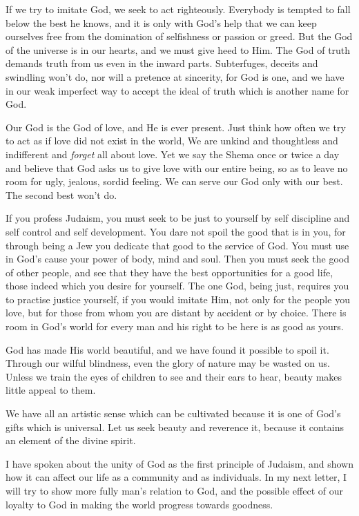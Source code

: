 If we try to imitate God, we seek to act righteously.
Everybody is tempted to fall below the best he knows, and
it is only with God's help that we can keep ourselves free
from the domination of selfishness or passion or greed.
But the God of the universe is in our hearts, and we must
give heed to Him. The God of truth demands truth from us
even in the inward parts. Subterfuges, deceits and
swindling won't do, nor will a pretence at sincerity, for
God is one, and we have in our weak imperfect way to accept
the ideal of truth which is another name for God.

Our God is the God of love, and He is ever present.
Just think how often we try to act as if love did not exist
in the world, We are unkind and thoughtless and indifferent
and \textsl{forget} all about love. Yet we say the Shema
once or twice a day and believe that God asks us to give
love with our entire being, so as to leave no room for
ugly, jealous, sordid feeling. We can serve our God only
with our best. The second best won't do.

If you profess Judaism, you must seek to be just to
yourself by self discipline and self control and self
development. You dare not spoil the good that is in you,
for through being a Jew you dedicate that good to the
service of God. You must use in God's cause your power of
body, mind and soul. Then you must seek the good of other
people, and see that they have the best opportunities for a
good life, those indeed which you desire for yourself. The
one God, being just, requires you to practise justice
yourself, if you would imitate Him, not only for the people
you love, but for those from whom you are distant by accident
or by choice. There is room in God's world for every
man and his right to be here is as good as yours.

God has made His world beautiful, and we have found it
possible to spoil it. Through our wilful blindness, even
the glory of nature may be wasted on us. Unless we train
the eyes of children to see and their ears to hear, beauty
makes little appeal to them.

We have all an artistic sense which can be cultivated
because it is one of God's gifts which is universal. Let
us seek beauty and reverence it, because it contains an
element of the divine spirit.

I have spoken about the unity of God as the first
principle of Judaism, and shown how it can affect our life
as a community and as individuals. In my next letter, I
will try to show more fully man's relation to God, and the
possible effect of our loyalty to God in making the world
progress towards goodness.


